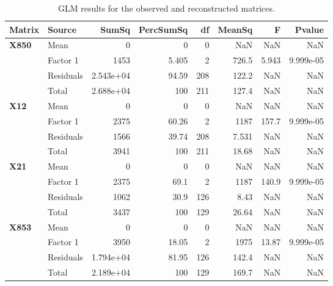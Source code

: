 \begin{table}[htbp]
\centering
\small
\caption{GLM results for the observed and reconstructed matrices.}
\label{tab:breast-cancer-anova}
\begin{tabular}{llrrrrrr}
\hline
Matrix & Source & SumSq & PercSumSq & df & MeanSq & F & Pvalue \\
\hline
\textbf{X850} & Mean & 0 & 0 & 0 & NaN & NaN & NaN \\
 & Factor 1 & 1453 & 5.405 & 2 & 726.5 & 5.943 & 9.999e-05 \\
 & Residuals & 2.543e+04 & 94.59 & 208 & 122.2 & NaN & NaN \\
 & Total & 2.688e+04 & 100 & 211 & 127.4 & NaN & NaN \\
\hline\hline
\textbf{X12} & Mean & 0 & 0 & 0 & NaN & NaN & NaN \\
 & Factor 1 & 2375 & 60.26 & 2 & 1187 & 157.7 & 9.999e-05 \\
 & Residuals & 1566 & 39.74 & 208 & 7.531 & NaN & NaN \\
 & Total & 3941 & 100 & 211 & 18.68 & NaN & NaN \\
\hline\hline
\textbf{X21} & Mean & 0 & 0 & 0 & NaN & NaN & NaN \\
 & Factor 1 & 2375 & 69.1 & 2 & 1187 & 140.9 & 9.999e-05 \\
 & Residuals & 1062 & 30.9 & 126 & 8.43 & NaN & NaN \\
 & Total & 3437 & 100 & 129 & 26.64 & NaN & NaN \\
\hline\hline
\textbf{X853} & Mean & 0 & 0 & 0 & NaN & NaN & NaN \\
 & Factor 1 & 3950 & 18.05 & 2 & 1975 & 13.87 & 9.999e-05 \\
 & Residuals & 1.794e+04 & 81.95 & 126 & 142.4 & NaN & NaN \\
 & Total & 2.189e+04 & 100 & 129 & 169.7 & NaN & NaN \\
\hline
\end{tabular}
\end{table}

